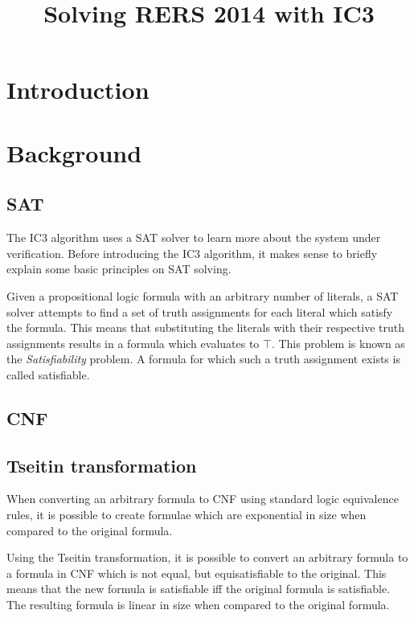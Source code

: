 \documentclass[a4paper]{article}
\begin{document}
\title{Solving RERS 2014 with IC3}
\maketitle

\section{Introduction}



\section{Background}
\subsection{SAT}
The IC3 algorithm uses a SAT solver to learn more about the system under verification. Before introducing the IC3 algorithm, it makes sense to briefly explain some basic principles on SAT solving.

Given a propositional logic formula with an arbitrary number of literals, a SAT solver attempts to find a set of truth assignments for each literal which satisfy the formula. This means that substituting the literals with their respective truth assignments results in a formula which evaluates to $\top$. This problem is known as the \emph{Satisfiability} problem. A formula for which such a truth assignment exists is called satisfiable.

\subsection{CNF}
\subsection{Tseitin transformation}
When converting an arbitrary formula to CNF using standard logic equivalence rules, it is possible to create formulae which are exponential in size when compared to the original formula.

Using the Tseitin transformation, it is possible to convert an arbitrary formula to a formula in CNF which is not equal, but equisatisfiable to the original. This means that the new formula is satisfiable iff the original formula is satisfiable. The resulting formula is linear in size when compared to the original formula.
\end{document}
